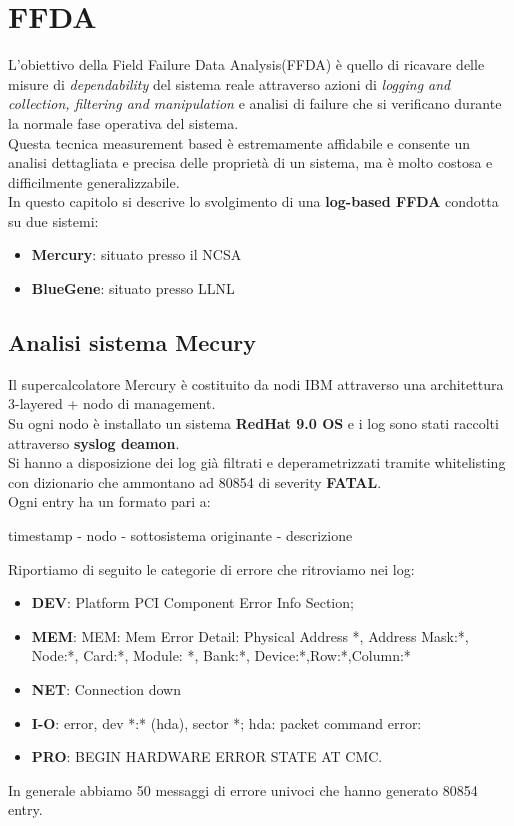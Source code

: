 
\chapter{FFDA}
L'obiettivo della Field Failure Data Analysis(FFDA) è quello di ricavare delle misure di \textit{dependability} del sistema reale attraverso azioni di \textit{logging and collection, filtering and manipulation} e analisi di failure che si verificano durante la normale fase operativa del sistema.\\
Questa tecnica measurement based è estremamente affidabile e consente un analisi dettagliata e precisa delle proprietà di un sistema, ma è molto costosa e difficilmente generalizzabile.\\
In questo capitolo si descrive lo svolgimento di una \textbf{log-based FFDA} condotta su due sistemi:
\begin{itemize}
\item \textbf{Mercury}: situato presso il NCSA
\item \textbf{BlueGene}: situato presso LLNL
\end{itemize}
\section{Analisi sistema Mecury}
Il supercalcolatore Mercury è costituito da nodi IBM attraverso una architettura 3-layered + nodo di management.\\
Su ogni nodo è installato un sistema \textbf{RedHat 9.0 OS} e i log sono stati raccolti attraverso \textbf{syslog deamon}.\\
Si hanno a disposizione dei log già filtrati e deperametrizzati tramite whitelisting con dizionario che ammontano ad 80854 di severity \textbf{FATAL}.\\
Ogni entry ha un formato pari a:
\begin{center}
timestamp - nodo - sottosistema originante - descrizione
\end{center}
Riportiamo di seguito le categorie di errore che ritroviamo nei log:
\begin{itemize}
\item \textbf{DEV}:  Platform PCI Component Error Info Section;
\item \textbf{MEM}: MEM: Mem Error Detail: Physical Address *, Address Mask:*, Node:*, Card:*, Module: *, Bank:*, Device:*,Row:*,Column:*
\item \textbf{NET}: Connection down
\item \textbf{I-O}:  error, dev *:* (hda), sector *; hda: packet command error:
\item \textbf{PRO}: BEGIN HARDWARE ERROR STATE AT CMC. 
\end{itemize}
In generale abbiamo 50 messaggi di errore univoci che hanno generato 80854 entry.
